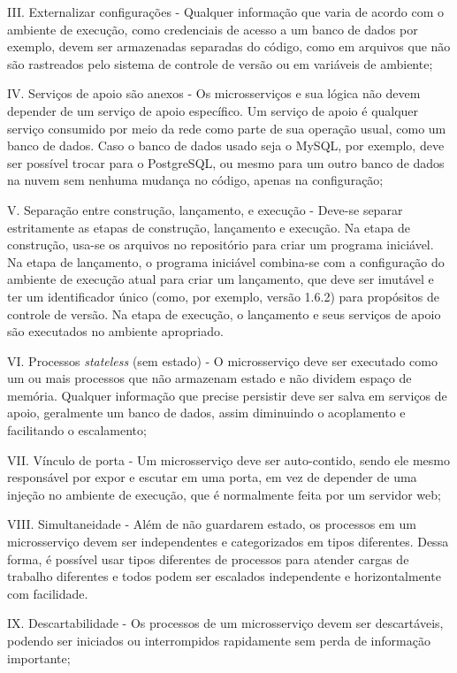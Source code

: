 III. Externalizar configurações - Qualquer informação que varia de acordo com o ambiente de execução, como credenciais de acesso a um banco de dados por exemplo, devem ser armazenadas separadas do código, como em arquivos que não são rastreados pelo sistema de controle de versão ou em variáveis de ambiente;

IV. Serviços de apoio são anexos - Os microsserviços e sua lógica não devem depender de um serviço de apoio específico. Um serviço de apoio é qualquer serviço consumido por meio da rede como parte de sua operação usual, como um banco de dados. Caso o banco de dados usado seja o MySQL, por exemplo, deve ser possível trocar para o PostgreSQL, ou mesmo para um outro banco de dados na nuvem sem nenhuma mudança no código, apenas na configuração;

V. Separação entre construção, lançamento, e execução - Deve-se separar estritamente as etapas de construção, lançamento e execução. Na etapa de construção, usa-se os arquivos no repositório para criar um programa iniciável. Na etapa de lançamento, o programa iniciável combina-se com a configuração do ambiente de execução atual para criar um lançamento, que deve ser imutável e ter um identificador único (como, por exemplo, versão 1.6.2) para propósitos de controle de versão. Na etapa de execução, o lançamento e seus serviços de apoio são executados no ambiente apropriado.

VI. Processos \emph{stateless} (sem estado) - O microsserviço deve ser executado como um ou mais processos que não armazenam estado e não dividem espaço de memória. Qualquer informação que precise persistir deve ser salva em serviços de apoio, geralmente um banco de dados, assim diminuindo o acoplamento e facilitando o escalamento;

VII. Vínculo de porta - Um microsserviço deve ser auto-contido, sendo ele mesmo responsável por expor e escutar em uma porta, em vez de depender de uma injeção no ambiente de execução, que é normalmente feita por um servidor web;

VIII. Simultaneidade - Além de não guardarem estado, os processos em um microsserviço devem ser independentes e categorizados em tipos diferentes. Dessa forma, é possível usar tipos diferentes de processos para atender cargas de trabalho diferentes e todos podem ser escalados independente e horizontalmente com facilidade.

IX. Descartabilidade - Os processos de um microsserviço devem ser descartáveis, podendo ser iniciados ou interrompidos rapidamente sem perda de informação importante;

